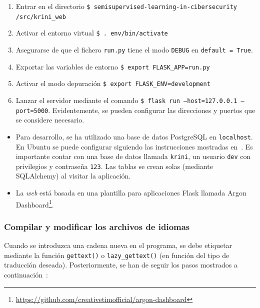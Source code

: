 \begin{enumerate}
	\item Entrar en el directorio \texttt{\$ semisupervised-learning-in-cibersecurity /src/krini\_web}
	\item Activar el entorno virtual \texttt{\$ . env/bin/activate}
	\item Asegurarse de que el fichero \texttt{run.py} tiene el modo \texttt{DEBUG} en \texttt{default = True}.
	\item Exportar las variables de entorno \texttt{\$ export FLASK\_APP=run.py}
	\item Activar el modo depuración \texttt{\$ export FLASK\_ENV=development}
	\item Lanzar el servidor mediante el comando \texttt{\$ flask run --host=127.0.0.1 --port=5000}. Evidentemente, se pueden configurar las direcciones y puertos que se considere necesario.
\end{enumerate}

\begin{itemize}
	\item Para desarrollo, se ha utilizado una base de datos PostgreSQL en \texttt{localhost}. En Ubuntu se puede configurar siguiendo las instrucciones mostradas en~\cite{postgrelocal}. Es importante contar con una base de datos llamada \texttt{krini}, un usuario \texttt{dev} con privilegios y contraseña \texttt{123}. Las tablas se crean solas (mediante SQLAlchemy) al visitar la aplicación.
	\item La \textit{web} está basada en una plantilla para aplicaciones Flask llamada Argon Dashboard\footnote{\url{https://github.com/creativetimofficial/argon-dashboard}}.
\end{itemize}

\subsubsection{Compilar y modificar los archivos de idiomas}

Cuando se introduzca una cadena nueva en el programa, se debe etiquetar mediante la función \texttt{gettext()} o \texttt{lazy\_gettext()} (en función del tipo de traducción deseada). Posteriormente, se han de seguir los pasos mostrados a continuación~\cite{pybabelmanual}:

